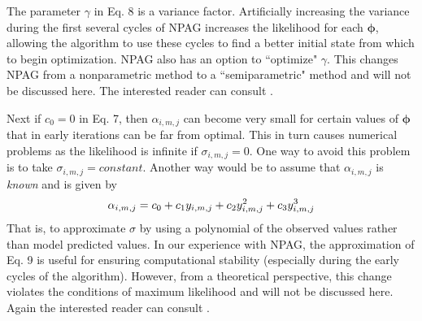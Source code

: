 %

The parameter $\gamma$ in Eq. 8 is a variance factor.  Artificially increasing the variance during the first several cycles of NPAG increases the likelihood for each $\bm{\phi}$, allowing the algorithm to use these cycles to find a better initial state from which to begin optimization.
NPAG also has an option to ``optimize" $\gamma$. This changes NPAG from a nonparametric method to  a ``semiparametric" method and will not be discussed here. The interested reader can consult \cite{LAPK-2014-01}.
%
%

Next if $c_0=0$ in Eq. 7,  then $\alpha_{i,m,j}$ can become very small for certain values of $\bm{\phi}$ that in early iterations can be far from optimal. This in turn causes numerical problems as the likelihood is infinite if $\sigma_{i,m,j}=0$.
One way to avoid this problem is to
take $\sigma_{i,m,j} = constant $. Another way
would be to  assume that $\alpha_{i,m,j}$ is {\em known} and is given by
\begin{equation}
\alpha_{i,m,j} = c_0 + c_1y_{i,m,j} + c_2 y_{i,m,j}^2 + c_3 y_{i,m,j}^3 \\
\end{equation}
That is, to approximate $\sigma$ by using a polynomial of the observed values rather than model predicted values.
In our experience with  NPAG, 
the approximation of Eq. 9 is useful for ensuring computational stability (especially during the early cycles of the algorithm). However, from a theoretical perspective, this change violates the conditions of maximum likelihood and will not be discussed here. Again the interested reader can consult \cite{LAPK-2014-01}.
%
%
%
